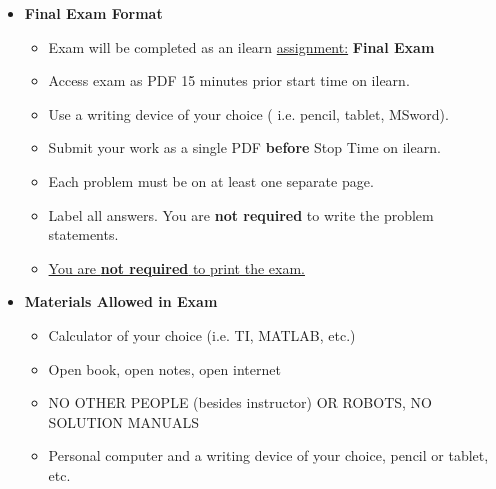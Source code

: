 \documentclass[11pt]{article}
\begin{document}
\begin{itemize}
             	\item  \textbf{\Large Final Exam \hspace{2mm} Format}
\begin{itemize}
		
			\item Exam will be completed as an ilearn \underline{assignment:} {\bf Final Exam } 
			
			\item Access exam as PDF 15 minutes prior start time on ilearn.
			\item Use a writing device of your choice ( i.e. pencil, tablet, MSword).
			\item Submit your work as a single PDF {\bf before} Stop Time on ilearn.		 		\item Each problem must be on at least one separate page.
			\item Label all answers. You are {\bf not required} to write the problem statements.
			\item \underline{You are {\bf not required} to print the exam.}
\end{itemize}


		

		\item  \textbf{ Materials Allowed in Exam}

	\begin{itemize}

		\item  Calculator of your choice (i.e. TI, MATLAB, etc.)
	
		\item  Open book, open notes, open internet
		
		\item  NO OTHER PEOPLE (besides instructor) OR ROBOTS, NO SOLUTION MANUALS\vspace{1mm}
		
		\item  Personal computer and a writing device of your choice, pencil or tablet, etc.
			

\end{itemize}
\end{itemize}
\end{document}

